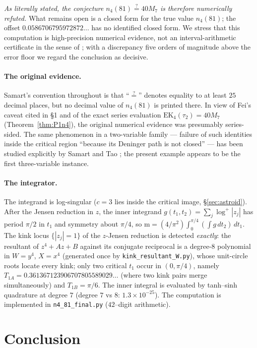 \documentclass[11pt]{article}
\theoremstyle{definition}
\theoremstyle{remark}
\newcommand{\m}{\mathrm{m}}
\begin{document}
\emph{As literally stated, the conjecture $n_4(81)\stackrel{?}{=}40M_7$
is therefore numerically refuted.} What remains open is a closed form
for the true value $n_4(81)$; the offset
$0.0586706795972872\ldots$ has no identified closed form. We stress
that this computation is high-precision numerical evidence, not an
interval-arithmetic certificate in the sense of \cite[\S6]{Zf}; with a
discrepancy five orders of magnitude above the error floor we regard
the conclusion as decisive.

\paragraph{The original evidence.} Samart's convention throughout
\cite{Sa15} is that ``$\stackrel{?}{=}$'' denotes equality to at least
$25$ decimal places, but no decimal value of $n_4(81)$ is printed
there. In view of Fei's caveat cited in \S1 and of the exact series
evaluation $\mathrm{EK}_4(\tau_2)=40M_7$ (Theorem~\ref{thm:P1n4}), the
original numerical evidence was presumably series-sided. The same
phenomenon in a two-variable family --- failure of such identities
inside the critical region ``because its Deninger path is not
closed'' --- has been studied explicitly by Samart and Tao \cite{ST};
the present example appears to be the first three-variable instance.

\paragraph{The integrator.} The integrand is log-singular ($c=3$ lies
inside the critical image, \S\ref{sec:astroid}). After the Jensen
reduction in $z$, the inner integrand $g(t_1,t_2)=\sum_j\log^+|z_j|$
has period $\pi/2$ in $t_1$ and symmetry about $\pi/4$, so
$\m=(4/\pi^2)\int_0^{\pi/4}(\int g\,dt_2)\,dt_1$. The kink locus
$\{|z_j|=1\}$ of the $z$-Jensen reduction is detected \emph{exactly}:
the resultant of $z^4+Az+B$ against its conjugate reciprocal is a
degree-$8$ polynomial in $W=y^4$, $X=x^4$ (generated once by
\texttt{kink\_resultant\_W.py}), whose unit-circle roots locate every
kink; only two critical $t_1$ occur in $(0,\pi/4)$, namely
$T_{1A}=0.361367123906707805589029\ldots$ (where two kink pairs merge
simultaneously) and $T_{1B}=\pi/6$. The inner integral is evaluated by
tanh--sinh quadrature at degree $7$ (degree $7$ vs $8$:
$1.3\times10^{-25}$). The computation is implemented in
\texttt{n4\_81\_final.py} ($42$--digit arithmetic).

\section{Conclusion}
\end{document}
